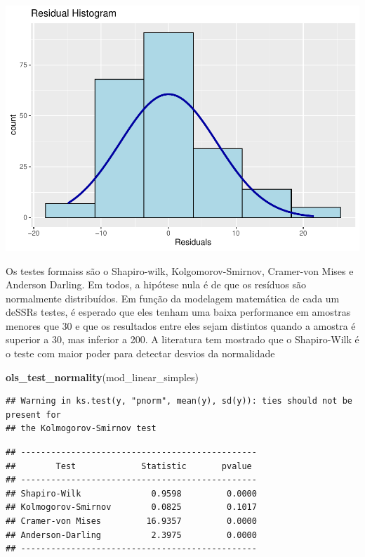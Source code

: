 \documentclass[
]{book}
\newenvironment{Shaded}{\begin{snugshade}}{\end{snugshade}}
\newcommand{\KeywordTok}[1]{\textcolor[rgb]{0.13,0.29,0.53}{\textbf{#1}}}
\newcommand{\NormalTok}[1]{#1}
\begin{document}
\begin{center}\includegraphics{gitbook-demo_files/figure-latex/unnamed-chunk-105-1} \end{center}

Os testes formaiss são o Shapiro-wilk, Kolgomorov-Smirnov, Cramer-von Mises e Anderson Darling. Em todos, a hipótese nula é de que os resíduos são normalmente distribuídos. Em função da modelagem matemática de cada um deSSRs testes, é esperado que eles tenham uma baixa performance em amostras menores que 30 e que os resultados entre eles sejam distintos quando a amostra é superior a 30, mas inferior a 200. A literatura tem mostrado que o Shapiro-Wilk é o teste com maior poder para detectar desvios da normalidade

\begin{Shaded}
\begin{Highlighting}[]
\KeywordTok{ols_test_normality}\NormalTok{(mod_linear_simples)}
\end{Highlighting}
\end{Shaded}

\begin{verbatim}
## Warning in ks.test(y, "pnorm", mean(y), sd(y)): ties should not be present for
## the Kolmogorov-Smirnov test
\end{verbatim}

\begin{verbatim}
## -----------------------------------------------
##        Test             Statistic       pvalue  
## -----------------------------------------------
## Shapiro-Wilk              0.9598         0.0000 
## Kolmogorov-Smirnov        0.0825         0.1017 
## Cramer-von Mises         16.9357         0.0000 
## Anderson-Darling          2.3975         0.0000 
## -----------------------------------------------
\end{verbatim}
\end{document}
